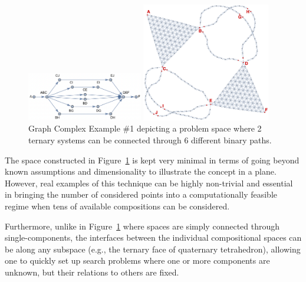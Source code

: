 \begin{figure}[H]
    \centering
    \begin{adjustbox}{valign=c}
        \includegraphics[width=0.45\textwidth]{nimplex/GraphComplexMap1.png}
    \end{adjustbox}
    \hspace{6pt}
    \begin{adjustbox}{valign=c}
        \includegraphics[width=0.5\textwidth]{nimplex/GraphComplex1Trim.png}
    \end{adjustbox}
    \caption{Graph Complex Example \#1 depicting a problem space where 2 ternary systems can be connected through 6 different binary paths.} 
    \label{nimplex:fig:graphcomplex1}
\end{figure}

The space constructed in Figure~\ref{nimplex:fig:graphcomplex1} is kept very minimal in terms of going beyond known assumptions and dimensionality to illustrate the concept in a plane. However, real examples of this technique can be highly non-trivial and essential in bringing the number of considered points into a computationally feasible regime when tens of available compositions can be considered. 

Furthermore, unlike in Figure~\ref{nimplex:fig:graphcomplex1} where spaces are simply connected through single-components, the interfaces between the individual compositional spaces can be along any subspace (e.g., the ternary face of quaternary tetrahedron), allowing one to quickly set up search problems where one or more components are unknown, but their relations to others are fixed. 

